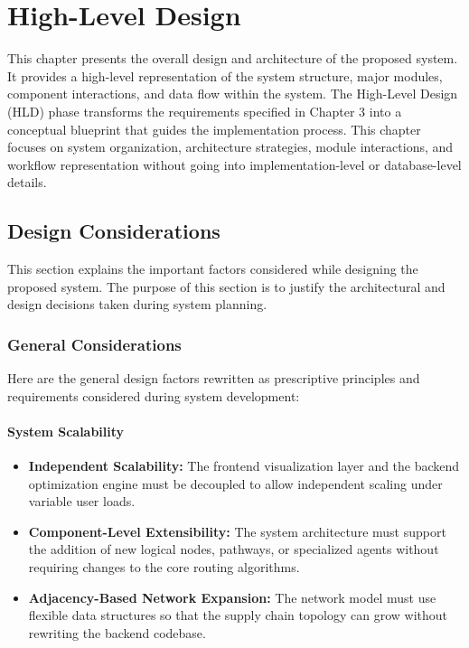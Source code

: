 \chapter[High-level Design]{High-Level Design}

This chapter presents the overall design and architecture of the proposed system. It provides a high-level representation of the system structure, major modules, component interactions, and
data flow within the system.
The High-Level Design (HLD) phase transforms the requirements specified in Chapter 3 into
a conceptual blueprint that guides the implementation process. This chapter focuses on
system organization, architecture strategies, module interactions, and workflow
representation without going into implementation-level or database-level details.

\section[Design Considerations]{Design Considerations}
This section explains the important factors considered while designing the proposed system.
The purpose of this section is to justify the architectural and design decisions taken during
system planning.
\subsection[General Considerations]{General Considerations}

Here are the general design factors rewritten as prescriptive principles and requirements considered during system development:

\subsubsection{System Scalability}
\begin{itemize}
    \item \textbf{Independent Scalability:} The frontend visualization layer and the backend optimization engine must be decoupled to allow independent scaling under variable user loads.
    \item \textbf{Component-Level Extensibility:} The system architecture must support the addition of new logical nodes, pathways, or specialized agents without requiring changes to the core routing algorithms.
    \item \textbf{Adjacency-Based Network Expansion:} The network model must use flexible data structures so that the supply chain topology can grow without rewriting the backend codebase.
\end{itemize}

